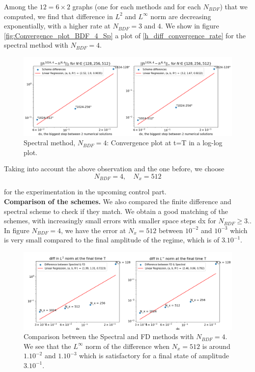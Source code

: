 \documentclass[12pt]{article}
\begin{document}
Among the $12=6\times2$ graphs (one for each methods and for each $N_{BDF}$) that we computed, we find that difference in $L^2$ and $L^{\infty}$ norm are decreasing exponentially, with a higher rate at $N_{BDF}=3$ and $4$. We show in figure \eqref{fig:Convergence_plot_BDF_4_Sp} a plot of \eqref{h_diff_convergence_rate} for the spectral method with $N_{BDF}=4.$
\\

\begin{figure}
    \begin{center}
        \includegraphics[width=\linewidth]{Verif_scheme/Convergence_graph_Sp_method.png}
    \end{center}
    \caption{Spectral method, $N_{BDF}=4$: Convergence plot at t=T in a log-log plot. }
    \label{fig:Convergence_plot_BDF_4_Sp}
\end{figure}

Taking into account the above observation and the one before, we choose 
\begin{equation}
\boxed{
    N_{BDF} = 4, \quad N_x = 512
}
\end{equation}

for the experimentation in the upcoming control part.
\\


\textbf{Comparison of the schemes.} We also compared the finite difference and spectral scheme to check if they match. We obtain a good matching of the schemes, with increasingly small errors with smaller space steps dx for $N_{BDF} \geq 3.$. In figure $N_{BDF}=4$, we have the error at $N_x = 512$ between $10^{-2}$ and ${10^{-3}}$ which is very small compared to the final amplitude of the regime, which is of $3.10^{-1}$.

\begin{figure}
    \centering
    \includegraphics[width=1\linewidth]{Verif_scheme/Comparison_scheme_BDF4.png}
    \caption{Comparison between the Spectral and FD methods with $N_{BDF}=4.$ We see that the $L^{\infty}$ norm of the difference when $N_x=512$ is around $1.10^{-2}$ and $1.10^{-3}$ which is satisfactory for a final state of amplitude $3.10^{-1}$. }
    \label{fig:enter-label}
\end{figure}
\vspace{0.5cm}
\end{document}
